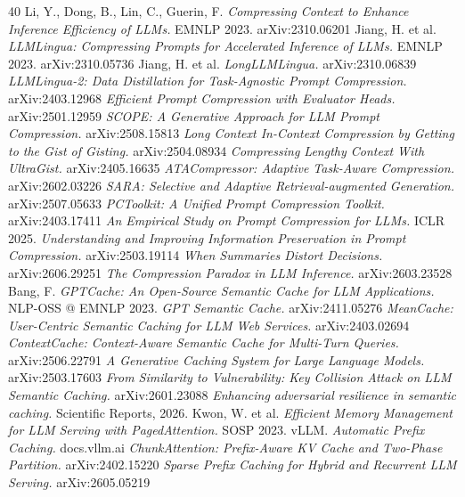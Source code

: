 \documentclass[11pt,a4paper]{article}
\begin{document}
\begin{thebibliography}{40}
\footnotesize
{} Li, Y., Dong, B., Lin, C., Guerin, F. \emph{Compressing Context to Enhance Inference Efficiency of LLMs.} EMNLP 2023. arXiv:2310.06201
 Jiang, H. et al. \emph{LLMLingua: Compressing Prompts for Accelerated Inference of LLMs.} EMNLP 2023. arXiv:2310.05736
 Jiang, H. et al. \emph{LongLLMLingua.} arXiv:2310.06839
 \emph{LLMLingua-2: Data Distillation for Task-Agnostic Prompt Compression.} arXiv:2403.12968
 \emph{Efficient Prompt Compression with Evaluator Heads.} arXiv:2501.12959
 \emph{SCOPE: A Generative Approach for LLM Prompt Compression.} arXiv:2508.15813
 \emph{Long Context In-Context Compression by Getting to the Gist of Gisting.} arXiv:2504.08934
 \emph{Compressing Lengthy Context With UltraGist.} arXiv:2405.16635
 \emph{ATACompressor: Adaptive Task-Aware Compression.} arXiv:2602.03226
 \emph{SARA: Selective and Adaptive Retrieval-augmented Generation.} arXiv:2507.05633
 \emph{PCToolkit: A Unified Prompt Compression Toolkit.} arXiv:2403.17411
 \emph{An Empirical Study on Prompt Compression for LLMs.} ICLR 2025.
 \emph{Understanding and Improving Information Preservation in Prompt Compression.} arXiv:2503.19114
 \emph{When Summaries Distort Decisions.} arXiv:2606.29251
 \emph{The Compression Paradox in LLM Inference.} arXiv:2603.23528
 Bang, F. \emph{GPTCache: An Open-Source Semantic Cache for LLM Applications.} NLP-OSS @ EMNLP 2023.
 \emph{GPT Semantic Cache.} arXiv:2411.05276
 \emph{MeanCache: User-Centric Semantic Caching for LLM Web Services.} arXiv:2403.02694
 \emph{ContextCache: Context-Aware Semantic Cache for Multi-Turn Queries.} arXiv:2506.22791
 \emph{A Generative Caching System for Large Language Models.} arXiv:2503.17603
 \emph{From Similarity to Vulnerability: Key Collision Attack on LLM Semantic Caching.} arXiv:2601.23088
 \emph{Enhancing adversarial resilience in semantic caching.} Scientific Reports, 2026.
 Kwon, W. et al. \emph{Efficient Memory Management for LLM Serving with PagedAttention.} SOSP 2023.
 vLLM. \emph{Automatic Prefix Caching.} docs.vllm.ai
 \emph{ChunkAttention: Prefix-Aware KV Cache and Two-Phase Partition.} arXiv:2402.15220
 \emph{Sparse Prefix Caching for Hybrid and Recurrent LLM Serving.} arXiv:2605.05219

\end{thebibliography}
\end{document}

